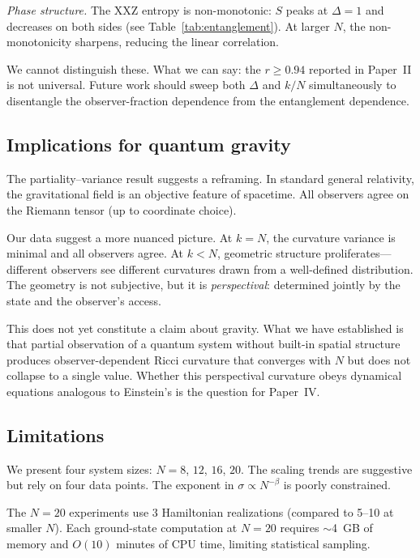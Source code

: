\documentclass[aps,pra,twocolumn,superscriptaddress,floatfix]{revtex4-2}
\begin{document}
\textit{Phase structure.}  The XXZ entropy is non-monotonic: $S$ peaks at $\Delta = 1$ and decreases on both sides (see Table~\ref{tab:entanglement}).  At larger $N$, the non-monotonicity sharpens, reducing the linear correlation.

We cannot distinguish these.  What we can say: the $r \geq 0.94$ reported in Paper~II is not universal.  Future work should sweep both $\Delta$ and $k/N$ simultaneously to disentangle the observer-fraction dependence from the entanglement dependence.


\subsection{Implications for quantum gravity}

The partiality--variance result suggests a reframing.  In standard general relativity, the gravitational field is an objective feature of spacetime.  All observers agree on the Riemann tensor (up to coordinate choice).

Our data suggest a more nuanced picture.  At $k = N$, the curvature variance is minimal and all observers agree.  At $k < N$, geometric structure proliferates---different observers see different curvatures drawn from a well-defined distribution.  The geometry is not subjective, but it is \textit{perspectival}: determined jointly by the state and the observer's access.

This does not yet constitute a claim about gravity.  What we have established is that partial observation of a quantum system without built-in spatial structure produces observer-dependent Ricci curvature that converges with $N$ but does not collapse to a single value.  Whether this perspectival curvature obeys dynamical equations analogous to Einstein's is the question for Paper~IV.


\subsection{Limitations}

We present four system sizes: $N = 8$, $12$, $16$, $20$.  The scaling trends are suggestive but rely on four data points.  The exponent in $\sigma \propto N^{-\beta}$ is poorly constrained.

The $N = 20$ experiments use 3 Hamiltonian realizations (compared to 5--10 at smaller $N$).  Each ground-state computation at $N = 20$ requires $\sim$4~GB of memory and $O(10)$ minutes of CPU time, limiting statistical sampling.
\end{document}
